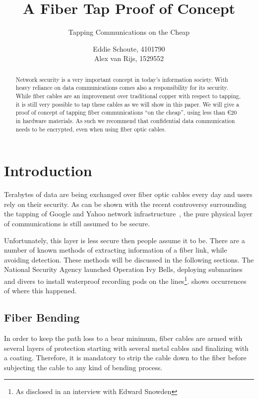 \documentclass[11pt,twoside,a4paper]{scrartcl}
\title{A Fiber Tap Proof of Concept}
\subtitle{Tapping Communications on the Cheap}
\author{%
		Eddie Schoute, 4101790\\
		Alex van Rijs, 1529552
	}
\begin{document}
\maketitle

\begin{abstract}
	\noindent Network security is a very important concept in today's information society.
	With heavy reliance on data communications comes also a responsibility for its security.
	While fiber cables are an improvement over traditional copper with respect to tapping,
	it is still very possible to tap these cables as we will show in this paper.
	We will give a proof of concept of tapping fiber communications ``on the cheap'',
	using less than \euro{}$20$ in hardware materials.
	As such we recommend that confidential data communication needs to be encrypted,
	even when using fiber optic cables.
\end{abstract}

\section{Introduction}
	Terabytes of data are being exchanged over fiber optic cables every day and users rely on their security.
	As can be shown with the recent controversy surrounding the tapping of Google and Yahoo network infrastructure~\cite{googleyahootap},
	the pure physical layer of communications is still assumed to be secure.

	Unfortunately, this layer is less secure then people assume it to be.
	There are a number of known methods of extracting information of a fiber link, while avoiding detection.
	These methods will be discussed in the following sections.
	The National Security Agency launched Operation Ivy Bells,
	deploying submarines and divers to install waterproof recording pods on the lines\footnote{As disclosed in an interview with Edward Snowden}.
	\cite{fibertap} shows occurrences of where this happened.

	\subsection{Fiber Bending}
		In order to keep the path loss to a bear minimum, fiber cables are armed with several layers of protection starting with several metal cables and finalizing with a coating. Therefore, it is mandatory to strip the cable down to the fiber before subjecting the cable to any kind of bending process. 
\end{document}
